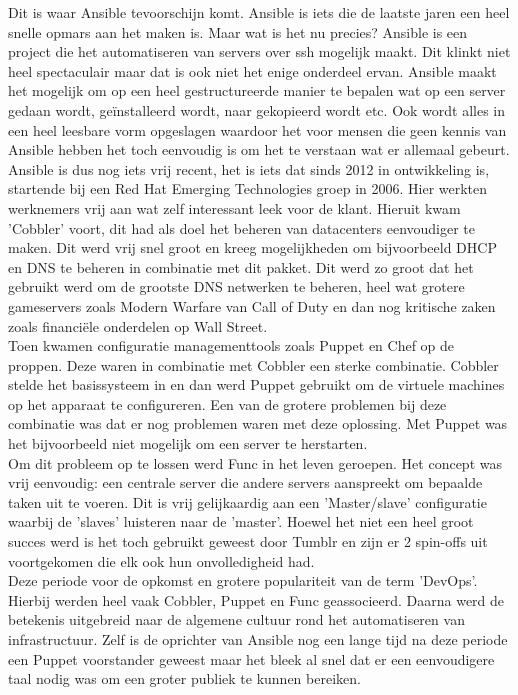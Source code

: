 Dit is waar Ansible tevoorschijn komt. Ansible is iets die de laatste jaren een heel snelle opmars aan het maken is. Maar wat is het nu precies? Ansible is een project die het automatiseren van servers over ssh mogelijk maakt. Dit klinkt niet heel spectaculair maar dat is ook niet het enige onderdeel ervan. Ansible maakt het mogelijk om op een heel gestructureerde manier te bepalen wat op een server gedaan wordt, geïnstalleerd wordt, naar gekopieerd wordt etc. Ook wordt alles in een heel leesbare vorm opgeslagen waardoor het voor mensen die geen kennis van Ansible hebben het toch eenvoudig is om het te verstaan wat er allemaal gebeurt. 
\\

Ansible is dus nog iets vrij recent, het is iets dat sinds 2012 in ontwikkeling is, startende bij een Red Hat Emerging Technologies groep in 2006. Hier werkten werknemers vrij aan wat zelf interessant leek voor de klant. Hieruit kwam 'Cobbler' voort, dit had als doel het beheren van datacenters eenvoudiger te maken.  Dit werd vrij snel groot en kreeg mogelijkheden om bijvoorbeeld DHCP en DNS te beheren in combinatie met dit pakket. Dit werd zo groot dat het gebruikt werd om de grootste DNS netwerken te beheren, heel wat grotere gameservers zoals Modern Warfare van Call of Duty en dan nog kritische zaken zoals financiële onderdelen op Wall Street. 
\\

Toen kwamen configuratie managementtools zoals Puppet en Chef op de proppen. Deze waren in combinatie met Cobbler een sterke combinatie. Cobbler stelde het basissysteem in en dan werd Puppet gebruikt om de virtuele machines op het apparaat te configureren. Een van de grotere problemen bij deze combinatie was dat er nog problemen waren met deze oplossing. Met Puppet was het bijvoorbeeld niet mogelijk om een server te herstarten.
\\

Om dit probleem op te lossen werd Func in het leven geroepen. Het concept was vrij eenvoudig: een centrale server die andere servers aanspreekt om bepaalde taken uit te voeren. Dit is vrij gelijkaardig aan een 'Master/slave' configuratie waarbij de 'slaves' luisteren naar de 'master'. Hoewel het niet een heel groot succes werd is het toch gebruikt geweest door Tumblr en zijn er 2 spin-offs uit voortgekomen die elk ook hun onvolledigheid had.
\\

Deze periode voor de opkomst en grotere populariteit van de term 'DevOps'. Hierbij werden heel vaak Cobbler, Puppet en Func geassocieerd. Daarna werd de betekenis uitgebreid naar de algemene cultuur rond het automatiseren van infrastructuur. 
Zelf is de oprichter van Ansible nog een lange tijd na deze periode een Puppet voorstander geweest maar het bleek al snel dat er een eenvoudigere taal nodig was om een groter publiek te kunnen bereiken. 
\\

